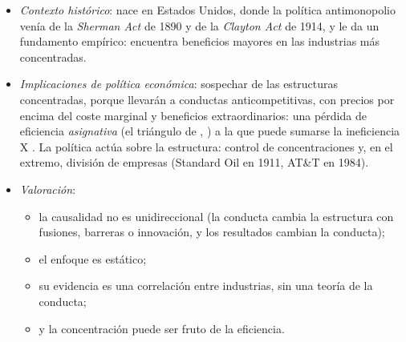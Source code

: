\documentclass[11pt]{article}
\begin{document}
\begin{itemize}
{\begin{itemize}
\item en la Unión Europea, las directrices de 2004 consideran improbables los problemas si el IHH tras la fusión no llega a 1.000, si está entre 1.000~y 2.000~y sube menos de 250~puntos, o si supera 2.000~y sube menos de 150\nocite{CE2004Horizontales}; el borrador de 2026, que la Comisión prevé aprobar a finales de año, mantiene esos umbrales\nocite{CE2026BorradorMerger}.
\end{itemize}} En el oligopolio de , el índice de  medio ponderado por las cuotas es proporcional al IHH, $\sum_i s_i\,\mathcal{L}_i=\mathrm{IHH}/(10.000\,|\varepsilon_{Q,p}|)$\nocite{CowlingWaterson1976Price}  (anexo~\ref{anexo:cowling-waterson}): es la base teórica del paradigma.
\item \emph{Contexto histórico}: nace en Estados Unidos, donde la política antimonopolio venía de la \emph{Sherman Act} de 1890 y de la \emph{Clayton Act} de 1914\nocite{FTC2026AntitrustLaws}, y le da un fundamento empírico: \textcite{Bain1951Relation} encuentra beneficios mayores en las industrias más concentradas.
\item \emph{Implicaciones de política económica}: sospechar de las estructuras concentradas, porque llevarán a conductas anticompetitivas, con precios por encima del coste marginal y beneficios extraordinarios: una pérdida de eficiencia \emph{asignativa} (el triángulo de , ) a la que puede sumarse la ineficiencia X . La política actúa sobre la estructura: control de concentraciones y, en el extremo, división de empresas (Standard Oil en 1911, AT\&T en 1984).
\item \emph{Valoración}:
  \begin{itemize}
  \item la causalidad no es unidireccional (la conducta cambia la estructura con fusiones, barreras o innovación, y los resultados cambian la conducta);
  \item el enfoque es estático;
  \item su evidencia es una correlación entre industrias, sin una teoría de la conducta;
  \item y la concentración puede ser fruto de la eficiencia.
  \end{itemize}
\end{itemize}

\begin{infografia}[H]
\centering
\caption{El paradigma estructura-conducta-resultado y las relaciones de vuelta}\label{figu:ecr}
\end{infografia}
\end{document}
